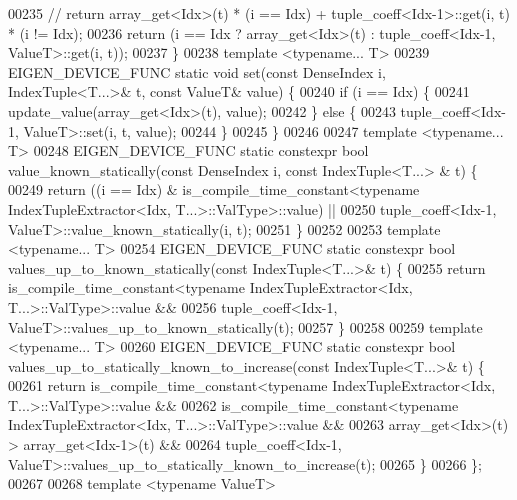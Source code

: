 \begin{DoxyCode}
00235     \textcolor{comment}{//    return array\_get<Idx>(t) * (i == Idx) + tuple\_coeff<Idx-1>::get(i, t) * (i != Idx);}
00236     \textcolor{keywordflow}{return} (i == Idx ? array\_get<Idx>(t) : tuple\_coeff<Idx-1, ValueT>::get(i, t));
00237   \}
00238   \textcolor{keyword}{template} <\textcolor{keyword}{typename}... T>
00239   EIGEN\_DEVICE\_FUNC \textcolor{keyword}{static} \textcolor{keywordtype}{void} \textcolor{keyword}{set}(\textcolor{keyword}{const} DenseIndex i, IndexTuple<T...>& t, \textcolor{keyword}{const} ValueT& value) \{
00240     \textcolor{keywordflow}{if} (i == Idx) \{
00241       update\_value(array\_get<Idx>(t), value);
00242     \} \textcolor{keywordflow}{else} \{
00243       tuple\_coeff<Idx-1, ValueT>::set(i, t, value);
00244     \}
00245   \}
00246 
00247   \textcolor{keyword}{template} <\textcolor{keyword}{typename}... T>
00248   EIGEN\_DEVICE\_FUNC \textcolor{keyword}{static} constexpr \textcolor{keywordtype}{bool} value\_known\_statically(\textcolor{keyword}{const} DenseIndex i, \textcolor{keyword}{const} IndexTuple<T...>
      & t) \{
00249     \textcolor{keywordflow}{return} ((i == Idx) & is\_compile\_time\_constant<\textcolor{keyword}{typename} IndexTupleExtractor<Idx, T...>::ValType>::value)
       ||
00250         tuple\_coeff<Idx-1, ValueT>::value\_known\_statically(i, t);
00251   \}
00252 
00253   \textcolor{keyword}{template} <\textcolor{keyword}{typename}... T>
00254   EIGEN\_DEVICE\_FUNC \textcolor{keyword}{static} constexpr \textcolor{keywordtype}{bool} values\_up\_to\_known\_statically(\textcolor{keyword}{const} IndexTuple<T...>& t) \{
00255     \textcolor{keywordflow}{return} is\_compile\_time\_constant<\textcolor{keyword}{typename} IndexTupleExtractor<Idx, T...>::ValType>::value &&
00256         tuple\_coeff<Idx-1, ValueT>::values\_up\_to\_known\_statically(t);
00257   \}
00258 
00259   \textcolor{keyword}{template} <\textcolor{keyword}{typename}... T>
00260   EIGEN\_DEVICE\_FUNC \textcolor{keyword}{static} constexpr \textcolor{keywordtype}{bool} values\_up\_to\_statically\_known\_to\_increase(\textcolor{keyword}{const} IndexTuple<T...>&
       t) \{
00261     \textcolor{keywordflow}{return} is\_compile\_time\_constant<\textcolor{keyword}{typename} IndexTupleExtractor<Idx, T...>::ValType>::value &&
00262            is\_compile\_time\_constant<\textcolor{keyword}{typename} IndexTupleExtractor<Idx, T...>::ValType>::value &&
00263            array\_get<Idx>(t) > array\_get<Idx-1>(t) &&
00264            tuple\_coeff<Idx-1, ValueT>::values\_up\_to\_statically\_known\_to\_increase(t);
00265   \}
00266 \};
00267 
00268 \textcolor{keyword}{template} <\textcolor{keyword}{typename} ValueT>

\end{DoxyCode}
